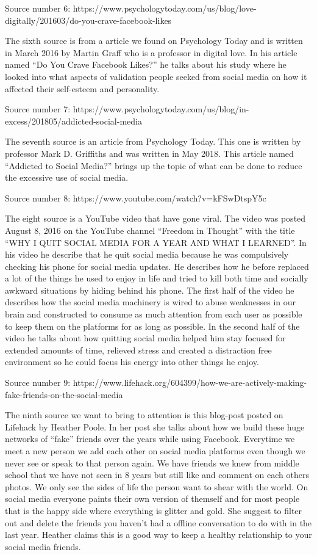 \documentclass[11pt]{article}
\begin{document}
Source number 6:
https://www.psychologytoday.com/us/blog/love-digitally/201603/do-you-crave-facebook-likes

The sixth source is from a article we found on Psychology Today and is written in March 2016 by Martin Graff who is a professor in digital love. In his article named “Do You Crave Facebook Likes?” he talks about his study where he looked into what aspects of validation people seeked from social media on how it affected their self-esteem and personality.

Source number 7:
https://www.psychologytoday.com/us/blog/in-excess/201805/addicted-social-media

The seventh source is an article from Psychology Today. This one is written by professor Mark D. Griffiths and was written in May 2018. This article named “Addicted to Social Media?” brings up the topic of what can be done to reduce the excessive use of social media.


Source number 8:
https://www.youtube.com/watch?v=kFSwDtspY5c

The eight source is a YouTube video that have gone viral. The video was posted August 8, 2016 on the YouTube channel “Freedom in Thought” with the title “WHY I QUIT SOCIAL MEDIA FOR A YEAR AND WHAT I LEARNED”. In his video he describe that he quit social media because he was compulsively checking his phone for social media updates. He describes how he before replaced a lot of the things he used to enjoy in life and tried to kill both time and socially awkward situations by hiding behind his phone. The first half of the video he describes how the social media machinery is wired to abuse weaknesses in our brain and constructed to consume as much attention from each user as possible to keep them on the platforms for as long as possible.
In the second half of the video he talks about how quitting social media helped him stay focused for extended amounts of time, relieved stress and created a distraction free environment so he could focus his energy into other things he enjoy.

Source number 9:
https://www.lifehack.org/604399/how-we-are-actively-making-fake-friends-on-the-social-media

The ninth source we want to bring to attention is this blog-post posted on Lifehack by Heather Poole. In her post she talks about how we build these huge networks of “fake” friends over the years while using Facebook. Everytime we meet a new person we add each other on social media platforms even though we never see or speak to that person again. We have friends we knew from middle school that we have not seen in 8 years but still like and comment on each others photos. We only see the sides of life the person want to shear with the world. On social media everyone paints their own version of themself and for most people that is the happy side where everything is glitter and gold. She suggest to filter out and delete the friends you haven’t had a offline conversation to do with in the last year. Heather claims this is a good way to keep a healthy relationship to your social media friends.
\end{document}
